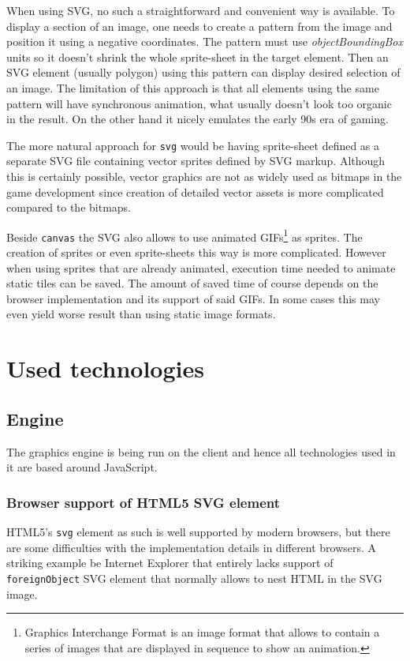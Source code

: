 \documentclass[11pt,oneside, final]{fithesis2}
\begin{document}
When using SVG, no such a straightforward and convenient way is available. To display a section of an image, one needs to create a pattern from the image and position it using a negative coordinates. The pattern must use \emph{objectBoundingBox} units so it doesn't shrink the whole sprite-sheet in the target element. Then an SVG element (usually polygon) using this pattern can display desired selection of an image. The limitation of this approach is that all elements using the same pattern will have synchronous animation, what usually doesn't look too organic in the result. On the other hand it nicely emulates the early 90s era of gaming.

The more natural approach for \texttt{svg} would be having sprite-sheet defined as a separate SVG file containing vector sprites defined by SVG markup. Although this is certainly possible, vector graphics are not as widely used as bitmaps in the game development since creation of detailed vector assets is more complicated compared to the bitmaps.

Beside \texttt{canvas} the SVG also allows to use animated GIFs\footnote{Graphics Interchange Format is an image format that allows to contain a series of images that are displayed in sequence to show an animation\cite{gifstandard}.} as sprites. The creation of sprites or even sprite-sheets this way is more complicated. However when using sprites that are already animated, execution time needed to animate static tiles can be saved. The amount of saved time of course depends on the browser implementation and its support of said GIFs. In some cases this may even yield worse result than using static image formats.

\chapter{Used technologies}
\label{tech}

\section{Engine}
The graphics engine is being run on the client and hence all technologies used in it are based around JavaScript.

\subsection{Browser support of HTML5 SVG element}
HTML5's \texttt{svg} element as such is well supported by modern browsers\cite{html5svg}, but there are some difficulties with the implementation details in different browsers. A striking example be Internet Explorer that entirely lacks support of \texttt{foreignObject} SVG element that normally allows to nest HTML in the SVG image\cite{ieforeignobject}.
\end{document}
